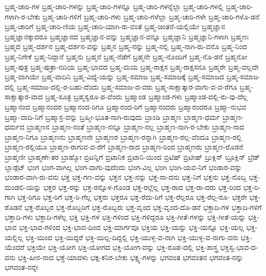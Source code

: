 {ಬ್ರಹ್ಮ-ಚಾರಿ-ಗಳ
ಬ್ರಹ್ಮ-ಚಾರಿ-ಗಳನ್ನು
ಬ್ರಹ್ಮ-ಚಾರಿ-ಗಳನ್ನೂ
ಬ್ರಹ್ಮ-ಚಾರಿ-ಗಳನ್ನೆಲ್ಲಾ
ಬ್ರಹ್ಮ-ಚಾರಿ-ಗಳಲ್ಲಿ
ಬ್ರಹ್ಮ-ಚಾರಿ-ಗಳಾಗಿ-ರ-ಬೇಕು
ಬ್ರಹ್ಮ-ಚಾರಿ-ಗಳಿಗೆ
ಬ್ರಹ್ಮ-ಚಾರಿ-ಗಳು
ಬ್ರಹ್ಮ-ಚಾರಿ-ಗಳೆಲ್ಲಾ
ಬ್ರಹ್ಮ-ಚಾರಿ-ಗಳೇ
ಬ್ರಹ್ಮ-ಚಾರಿ-ಗಳೊ-ಡನೆ
ಬ್ರಹ್ಮ-ಚಾರಿಗೆ
ಬ್ರಹ್ಮ-ಚಾರಿ-ಣಿಯ
ಬ್ರಹ್ಮ-ಚಾರಿ-ಯಾಗಿ-ರು-ವಂತೆ
ಬ್ರಹ್ಮ-ಚಿಂತನೆ-ಯಲ್ಲಿಯೇ
ಬ್ರಹ್ಮಜ್ಞಾನ
ಬ್ರಹ್ಮಜ್ಞಾನಕ್ಕಾದರೂ
ಬ್ರಹ್ಮಜ್ಞಾನದ
ಬ್ರಹ್ಮಜ್ಞಾನ-ವನ್ನು
ಬ್ರಹ್ಮಜ್ಞಾನ-ವನ್ನೂ
ಬ್ರಹ್ಮಜ್ಞಾನಿ
ಬ್ರಹ್ಮಜ್ಞಾನಿ-ಗಳಾಗಿ
ಬ್ರಹ್ಮಣಃ
ಬ್ರಹ್ಮದ
ಬ್ರಹ್ಮ-ದರ್ಶನ
ಬ್ರಹ್ಮ-ದರ್ಶನ-ವನ್ನು
ಬ್ರಹ್ಮನ
ಬ್ರಹ್ಮ-ನನ್ನು
ಬ್ರಹ್ಮ-ನಲ್ಲಿ
ಬ್ರಹ್ಮ-ನಾಗಿ-ರು-ವನೊ
ಬ್ರಹ್ಮ-ನಿಂದ
ಬ್ರಹ್ಮ-ನಿಗೇಕೆ
ಬ್ರಹ್ಮ-ನಿದ್ದಾನೆ
ಬ್ರಹ್ಮನು
ಬ್ರಹ್ಮನೆ
ಬ್ರಹ್ಮ-ನೆಡೆಗೆ
ಬ್ರಹ್ಮನೇ
ಬ್ರಹ್ಮ-ನೊಂದಿಗೆ
ಬ್ರಹ್ಮ-ನೊ-ಡನೆ
ಬ್ರಹ್ಮನೋ
ಬ್ರಹ್ಮ-ಪುತ್ರ
ಬ್ರಹ್ಮ-ಪುತ್ರಾ-ನದಿಯ
ಬ್ರಹ್ಮ-ಭಾವದ
ಬ್ರಹ್ಮ-ಮಯ
ಬ್ರಹ್ಮ-ರಾಕ್ಷಸ
ಬ್ರಹ್ಮ-ರಾಕ್ಷಸನೂ
ಬ್ರಹ್ಮರೇ
ಬ್ರಹ್ಮ-ವಲ್ಲದೇ
ಬ್ರಹ್ಮ-ವಾಗಿಯೇ
ಬ್ರಹ್ಮ-ವಾದಿನಿ
ಬ್ರಹ್ಮ-ವಿದ್ಯೆ-ಯನ್ನು
ಬ್ರಹ್ಮ-ಸಮಾಜ
ಬ್ರಹ್ಮ-ಸಮಾಜಕ್ಕೆ
ಬ್ರಹ್ಮ-ಸಮಾಜದ
ಬ್ರಹ್ಮ-ಸಮಾಜ-ದಲ್ಲಿ
ಬ್ರಹ್ಮ-ಸಮಾಜ-ದಲ್ಲಿ-ರ-ಬಹು-ದೆಂದು
ಬ್ರಹ್ಮ-ಸಮಾಜ-ದ-ವರು
ಬ್ರಹ್ಮ-ಸಾಕ್ಷಾತ್ಕಾರ-ವಾಗು-ವ-ವ-ರೆಗೂ
ಬ್ರಹ್ಮ-ಸಾಕ್ಷಾತ್ಕಾರ-ವಾದ
ಬ್ರಹ್ಮ-ಸೂತ್ರ
ಬ್ರಹ್ಮಸ್ವರೂ-ಪ-ವೆಂದು
ಬ್ರಹ್ಮಾಂಡ
ಬ್ರಹ್ಮಾಂಡ-ಗಳು
ಬ್ರಹ್ಮಾಂಡ-ದಲ್ಲಿ-ರು-ವು-ದೆಲ್ಲ
ಬ್ರಹ್ಮಾನಂದ
ಬ್ರಹ್ಮಾನಂದರ
ಬ್ರಹ್ಮಾನಂದ-ರಿಗೂ
ಬ್ರಹ್ಮಾನಂದ-ರಿಗೆ
ಬ್ರಹ್ಮಾನಂದರು
ಬ್ರಹ್ಮಾನಂದರೂ
ಬ್ರಹ್ಮಾ-ನುಭವ
ಬ್ರಹ್ಮಾ-ವಾದಿ-ನಿಗೆ
ಬ್ರಹ್ಮಾಸ್ರ-ವನ್ನು
ಬ್ರಹ್ಮೀ-ಭೂತ-ನಾಗಿ-ರುವುದು
ಬ್ರಾಂಡಿ
ಬ್ರಾಹ್ಮಣ
ಬ್ರಾಹ್ಮಣ-ಧರ್ಮ
ಬ್ರಾಹ್ಮಣ-ಧರ್ಮದ
ಬ್ರಾಹ್ಮಣನ
ಬ್ರಾಹ್ಮಣ-ನಂತೆ
ಬ್ರಾಹ್ಮಣ-ನನ್ನೂ
ಬ್ರಾಹ್ಮಣ-ನಲ್ಲ
ಬ್ರಾಹ್ಮಣ-ನಾಗಿ-ರ-ಬೇಕು
ಬ್ರಾಹ್ಮಣ-ನಾದ
ಬ್ರಾಹ್ಮಣ-ನಿಗೂ
ಬ್ರಾಹ್ಮಣನು
ಬ್ರಾಹ್ಮಣನೇ
ಬ್ರಾಹ್ಮಣರ
ಬ್ರಾಹ್ಮಣ-ರನ್ನಾಗಿ
ಬ್ರಾಹ್ಮಣ-ರಲ್ಲ-ವೆಂದೂ
ಬ್ರಾಹ್ಮಣ-ರಲ್ಲಿ
ಬ್ರಾಹ್ಮಣ-ರಲ್ಲಿಯೂ
ಬ್ರಾಹ್ಮಣ-ರಾಗುವ-ವ-ರೆಗೆ
ಬ್ರಾಹ್ಮಣ-ರಾದ
ಬ್ರಾಹ್ಮಣ-ರಿಂದ
ಬ್ರಾಹ್ಮಣರು
ಬ್ರಾಹ್ಮಣ-ರೊಡನೆ
ಬ್ರಾಹ್ಮಣೀ
ಬ್ರಾಹ್ಮಣೇ-ತರ
ಬ್ರಾಹ್ಮೋ
ಬ್ರಿಟನ್ನಿಗೆ
ಬ್ರಿಟಾನಿಕ
ಬ್ರಿಟಾನಿ-ಯಿಂದ
ಬ್ರಿಟಿಷ್
ಬ್ರಿಟೀಷ್
ಬ್ರುಕ್ಲಿನ್
ಬ್ರೂಕ್ಲಿನ್
ಬ್ರೆಡ್
ಬ್ಲಾಡ್ಗೆಟ್
ಭಂಗ
ಭಂಗ-ವಾಗಿಲ್ಲ
ಭಂಗ-ವಾಗು-ವುದೆಂದು
ಭಂಗ-ವಿಲ್ಲ
ಭಂಗಿ
ಭಂಗಿ-ಯವ-ನಿಗೆ
ಭಂಡಾರ-ವನ್ನು
ಭಂಡಾರ-ವಾಗಿ-ರು-ವನು
ಭಕ್ತ
ಭಕ್ತ-ಗಣ-ವನ್ನು
ಭಕ್ತನ
ಭಕ್ತ-ನನ್ನು
ಭಕ್ತ-ನಾ-ದನು
ಭಕ್ತ-ನಿಗೆ
ಭಕ್ತನು
ಭಕ್ತ-ನೊಬ್ಬ
ಭಕ್ತ-ಮಂಡಲಿ-ಯನ್ನು
ಭಕ್ತರ
ಭಕ್ತ-ರನ್ನು
ಭಕ್ತ-ರನ್ನೊಳ-ಗೊಂಡ
ಭಕ್ತ-ರಲ್ಲೆಲ್ಲ
ಭಕ್ತ-ರಾದ
ಭಕ್ತ-ರಾ-ದರು
ಭಕ್ತ-ರಿಂದ
ಭಕ್ತ-ರಿ-ಗಾಗಿ
ಭಕ್ತ-ರಿಗೂ
ಭಕ್ತ-ರಿಗೆ
ಭಕ್ತ-ರಿ-ಗೆಲ್ಲ
ಭಕ್ತರು
ಭಕ್ತರೂ
ಭಕ್ತ-ರೆದು-ರಿಗೆ
ಭಕ್ತ-ರೆಲ್ಲರೂ
ಭಕ್ತ-ರೆಲ್ಲ-ರೂ-
ಭಕ್ತರೇ
ಭಕ್ತ-ರೊಡನೆ
ಭಕ್ತ-ರೊಬ್ಬರ
ಭಕ್ತ-ರೊಬ್ಬರಿಗೆ
ಭಕ್ತ-ರೊಬ್ಬರು
ಭಕ್ತ-ವೃಂದ
ಭಕ್ತ-ವೃಂದ-ದೊ-ಡನೆ
ಭಕ್ತಾದಿ-ಗಳ
ಭಕ್ತಾದಿ-ಗಳಿಗೆ
ಭಕ್ತಾದಿ-ಗಳು
ಭಕ್ತಾದಿ-ಗಳೆಲ್ಲ
ಭಕ್ತಿ
ಭಕ್ತಿ-ಗಳ
ಭಕ್ತಿ-ಗಳಿಂದ
ಭಕ್ತಿ-ಗಳಿದ್ದರೂ
ಭಕ್ತಿ-ಗೀತೆ-ಗಳನ್ನು
ಭಕ್ತಿ-ಗೀತೆ-ಯನ್ನು
ಭಕ್ತಿ-ಭಾವ
ಭಕ್ತಿ-ಭಾವ-ಗಳಿಂದ
ಭಕ್ತಿ-ಭಾವ-ದಿಂದ
ಭಕ್ತಿ-ಮಾರ್ಗವೂ
ಭಕ್ತಿಯ
ಭಕ್ತಿ-ಯನ್ನು
ಭಕ್ತಿ-ಯನ್ನೂ
ಭಕ್ತಿ-ಯಲ್ಲ
ಭಕ್ತಿ-ಯಲ್ಲಿಲ್ಲ
ಭಕ್ತಿ-ಯಿಂದ
ಭಕ್ತಿ-ಯಿದ್ದರೆ
ಭಕ್ತಿ-ಯಿಲ್ಲ-ದಿದ್ದಲ್ಲಿ
ಭಕ್ತಿ-ಯುಳ್ಳ-ವ-ನಾಗಿ
ಭಕ್ತಿ-ಯುಳ್ಳ-ವ-ನಾಗು-ವನು
ಭಕ್ತಿ-ಯೆಂದರೆ
ಭಕ್ತಿಯೇ
ಭಕ್ತಿ-ಯೋಗ
ಭಕ್ತಿ-ಯೋಗದ
ಭಕ್ತಿ-ಯೋಗ-ವನ್ನು
ಭಕ್ತಿ-ರೂಪ-ದಲ್ಲಿ
ಭಕ್ತಿ-ಶಾಸ್ತ್ರ
ಭಕ್ತಿಸ್ವ-ಭಾವ-ದ-ವನು
ಭಕ್ತಿ-ಹೀನ-ನಾದ
ಭಕ್ತೆ-ಯಾದಳು
ಭಕ್ಷ-ಕನಿರ-ಬೇಕು
ಭಕ್ಷ್ಯ-ಗಳನ್ನು
ಭಗವಂತ
ಭಗವಂತನ
ಭಗವಂತ-ನನ್ನು
ಭಗವಂತ-ನನ್ನೇ
}
